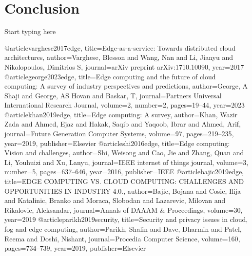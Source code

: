 \documentclass[conference]{IEEEtran}
\begin{document}
\section{Conclusion}
Start typing here

\begin{thebibliography}{00}
@article{varghese2017edge,
	title={Edge-as-a-service: Towards distributed cloud architectures},
	author={Varghese, Blesson and Wang, Nan and Li, Jianyu and Nikolopoulos, Dimitrios S},
	journal={arXiv preprint arXiv:1710.10090},
	year={2017}
}
@article{george2023edge,
	title={Edge computing and the future of cloud computing: A survey of industry perspectives and predictions},
	author={George, A Shaji and George, AS Hovan and Baskar, T},
	journal={Partners Universal International Research Journal},
	volume={2},
	number={2},
	pages={19--44},
	year={2023}
}
@article{khan2019edge,
	title={Edge computing: A survey},
	author={Khan, Wazir Zada and Ahmed, Ejaz and Hakak, Saqib and Yaqoob, Ibrar and Ahmed, Arif},
	journal={Future Generation Computer Systems},
	volume={97},
	pages={219--235},
	year={2019},
	publisher={Elsevier}
}
@article{shi2016edge,
	title={Edge computing: Vision and challenges},
	author={Shi, Weisong and Cao, Jie and Zhang, Quan and Li, Youhuizi and Xu, Lanyu},
	journal={IEEE internet of things journal},
	volume={3},
	number={5},
	pages={637--646},
	year={2016},
	publisher={IEEE}
}
@article{bajic2019edge,
	title={EDGE COMPUTING VS. CLOUD COMPUTING: CHALLENGES AND OPPORTUNITIES IN INDUSTRY 4.0.},
	author={Bajic, Bojana and Cosic, Ilija and Katalinic, Branko and Moraca, Slobodan and Lazarevic, Milovan and Rikalovic, Aleksandar},
	journal={Annals of DAAAM \& Proceedings},
	volume={30},
	year={2019}
}
@article{parikh2019security,
	title={Security and privacy issues in cloud, fog and edge computing},
	author={Parikh, Shalin and Dave, Dharmin and Patel, Reema and Doshi, Nishant},
	journal={Procedia Computer Science},
	volume={160},
	pages={734--739},
	year={2019},
	publisher={Elsevier}
}
\end{thebibliography}
\end{document}
